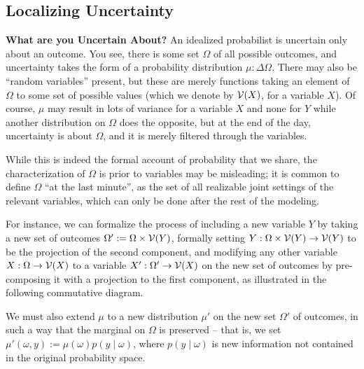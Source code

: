 \documentclass[the-pdg-manual.tex]{subfiles}
\begin{document}
	\subsection{Localizing Uncertainty}
    \textbf{What are you Uncertain About?}
    An idealized probabilist is uncertain only about an outcome. You see, there is some set $\Omega$ of all possible outcomes, and uncertainty takes the form of a probability distribution $\mu : \Delta\Omega$. There may also be ``random variables'' present, but these are merely functions taking an element of $\Omega$ to some set of possible values (which we denote by $\mathcal V(X)$, for a variable $X$).
    Of course, $\mu$ may result in lots of variance for a variable $X$ and none for $Y$ while another distribution on $\Omega$ does the opposite,
    but at the end of the day, uncertainty is about $\Omega$, and it is merely filtered through the variables.

    While this is indeed the formal account of probability that we share, the characterization of $\Omega$ is prior to variables may be misleading; it is common to define $\Omega$ ``at the last minute'', as the set of all realizable joint settings of the relevant variables, which can only be done after the rest of the modeling.

    \begin{example}
        For instance, we can formalize the process of including a new variable $Y$ by taking a new set of outcomes $\Omega' := \Omega \times \mathcal V(Y)$, formally setting $Y : \Omega \times \mathcal V(Y) \to \mathcal V(Y)$ to be the projection of the second component, and modifying any other variable $X : \Omega \to \mathcal V(X)$ to a variable $X' : \Omega' \to \mathcal V(X)$ on the new set of outcomes by pre-composing it with a projection to the first component, as illustrated in the following commutative diagram.
        \begin{center}
        \end{center}

        We must also extend $\mu$ to a new distribution $\mu'$ on the new set $\Omega'$ of outcomes, in such a way that the marginal on $\Omega$ is preserved -- that is, we set $\mu'(\omega, y) := \mu(\omega) p(y \mid \omega)$, where $p(y \mid \omega)$ is new information not contained in the original probability space.
    \end{example}
\end{document}

